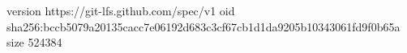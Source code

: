 version https://git-lfs.github.com/spec/v1
oid sha256:bccb5079a20135cacc7e06192d683c3cf67cb1d1da9205b10343061fd9f0b65a
size 524384
